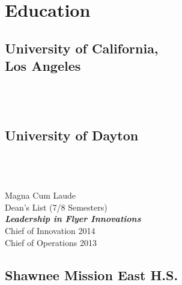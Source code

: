 \documentclass[letterpaper]{deedy-resume} %
\begin{document}
\begin{minipage}[t]{0.32\textwidth} %


\section{Education} 

\subsection[UCLA]{University of California,\\ Los Angeles}

 \\
 \\

\sectionspace %


\subsection{University of Dayton}
 \\
 \\
 \\
Magna Cum Laude\\
Dean's List (7/8 Semesters) \\
{\footnotesize \textit{\textbf{Leadership in Flyer Innovations}}} \\
Chief of Innovation \hfill 2014\\
Chief of Operations \hfill 2013\\


\sectionspace %


\subsection{Shawnee Mission East H.S.}


\end{minipage}
\end{document}
